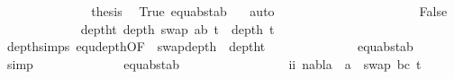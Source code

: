 \begin{isabellebody}
\ \ \ \ \ \ \ \ \ \ \ \isamarkupfalse%
\ \isamarkupfalse%
\ {\isacharquery}{\kern0pt}thesis\ \isamarkupfalse%
\ True\ equ{\isacharunderscore}{\kern0pt}abst{\isacharunderscore}{\kern0pt}ab{\isacharparenleft}{\kern0pt}{}{\isacharparenright}{\kern0pt}\ {}{\isacharparenleft}{\kern0pt}{}{\isacharcomma}{\kern0pt}{}{\isacharparenright}{\kern0pt}\ \isamarkupfalse%
\ auto\isanewline
\ \ \ \ \ \ \ \ \ \isamarkupfalse%
\isanewline
\ \ \ \ \ \ \ \ \ \ \ \isamarkupfalse%
\ False\isanewline
\isanewline
\ \ \ \ \ \ \ \ \ \ \ \isamarkupfalse%
\ deptht{}{\isacharcolon}{\kern0pt}\ {\isachardoublequoteopen}depth\ {\isacharparenleft}{\kern0pt}swap\ {\isacharbrackleft}{\kern0pt}{\isacharparenleft}{\kern0pt}a{\isacharcomma}{\kern0pt}b{\isacharparenright}{\kern0pt}{\isacharbrackright}{\kern0pt}\ t{}{\isacharprime}{\kern0pt}{\isacharparenright}{\kern0pt}\ {\isacharless}{\kern0pt}\ depth\ t{}{\isachardoublequoteclose}\isanewline
\ \ \ \ \ \ \ \ \ \ \ \ \ \ \isamarkupfalse%
\ depth{\isachardot}{\kern0pt}simps{\isacharparenleft}{\kern0pt}{}{\isacharparenright}{\kern0pt}\ equ{\isacharunderscore}{\kern0pt}depth{\isacharbrackleft}{\kern0pt}OF\ {}{\isacharparenleft}{\kern0pt}{}{\isacharparenright}{\kern0pt}{\isacharbrackright}{\kern0pt}\ swap{\isacharunderscore}{\kern0pt}depth\ {}{\isacharparenleft}{\kern0pt}{}{\isacharparenright}{\kern0pt}\ deptht{}\isanewline
\ \ \ \ \ \ \ \ \ \ \ \ \ \ equ{\isacharunderscore}{\kern0pt}abst{\isacharunderscore}{\kern0pt}ab{\isacharparenleft}{\kern0pt}{}{\isacharparenright}{\kern0pt}\ \isamarkupfalse%
\ simp\isanewline
\isanewline
\ \ \ \ \ \ \ \ \ \ \ \ \isamarkupfalse%
\ equ{\isacharunderscore}{\kern0pt}abst{\isacharunderscore}{\kern0pt}ab{\isacharparenleft}{\kern0pt}{}{\isacharcomma}{\kern0pt}{}{\isacharcomma}{\kern0pt}{}{\isacharparenright}{\kern0pt}\ {}{\isacharparenleft}{\kern0pt}{}{\isacharcomma}{\kern0pt}{}{\isacharcomma}{\kern0pt}{}{\isacharparenright}{\kern0pt}\isanewline
\ \ \ \ \ \ \ \ \ \ \ \ \ \ \isamarkupfalse%
\ ii{\isacharcolon}{\kern0pt}\ {\isachardoublequoteopen}nabla\ {\isasymturnstile}\ a\ {\isasymsharp}\ swap\ {\isacharbrackleft}{\kern0pt}{\isacharparenleft}{\kern0pt}b{\isacharcomma}{\kern0pt}c{\isacharparenright}{\kern0pt}{\isacharbrackright}{\kern0pt}\ t{}{\isacharprime}{\kern0pt}{\isachardoublequoteclose}\isanewline

\end{isabellebody}
